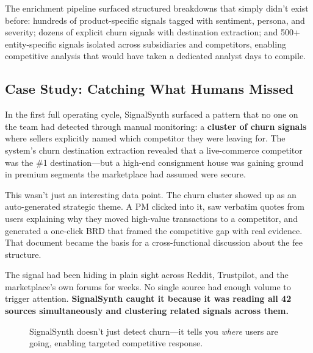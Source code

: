 \documentclass[11pt]{article}
\begin{document}
The enrichment pipeline surfaced structured breakdowns that simply didn't exist before: hundreds of product-specific signals tagged with sentiment, persona, and severity; dozens of explicit churn signals with destination extraction; and 500+ entity-specific signals isolated across subsidiaries and competitors, enabling competitive analysis that would have taken a dedicated analyst days to compile.

\subsection{Case Study: Catching What Humans Missed}
\label{sec:case}

In the first full operating cycle, SignalSynth surfaced a pattern that no one on the team had detected through manual monitoring: a \textbf{cluster of churn signals} where sellers explicitly named which competitor they were leaving for. The system's churn destination extraction revealed that a live-commerce competitor was the \#1 destination---but a high-end consignment house was gaining ground in premium segments the marketplace had assumed were secure.

This wasn't just an interesting data point. The churn cluster showed up as an auto-generated strategic theme. A PM clicked into it, saw verbatim quotes from users explaining why they moved high-value transactions to a competitor, and generated a one-click BRD that framed the competitive gap with real evidence. That document became the basis for a cross-functional discussion about the fee structure.

The signal had been hiding in plain sight across Reddit, Trustpilot, and the marketplace's own forums for weeks. No single source had enough volume to trigger attention. \textbf{SignalSynth caught it because it was reading all 42 sources simultaneously and clustering related signals across them.}

\begin{figure}[h]
\centering
{}
\caption{SignalSynth doesn't just detect churn---it tells you \textit{where} users are going, enabling targeted competitive response.}
\label{fig:churn}
\end{figure}
\end{document}
